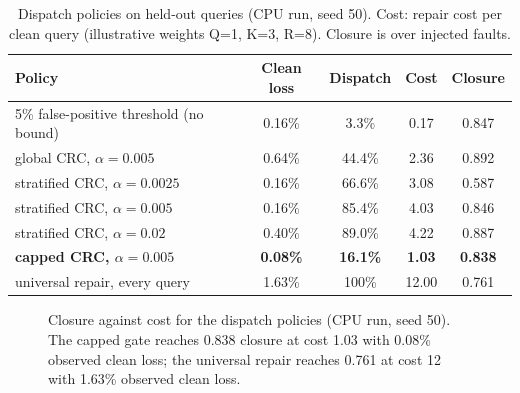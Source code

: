 \documentclass[conference]{IEEEtran}
\begin{document}
\begin{table}[t]
\caption{Dispatch policies on held-out queries (CPU run, seed 50). Cost: repair cost per clean query (illustrative weights Q=1, K=3, R=8). Closure is over injected faults.}
\label{tab:policy}
\centering\footnotesize
\begin{tabular}{@{}lcccc@{}}
\toprule
Policy & Clean loss & Dispatch & Cost & Closure\\
\midrule
5\% false-positive threshold (no bound) & 0.16\% & 3.3\% & 0.17 & 0.847\\
global CRC, $\alpha{=}0.005$ & 0.64\% & 44.4\% & 2.36 & 0.892\\
stratified CRC, $\alpha{=}0.0025$ & 0.16\% & 66.6\% & 3.08 & 0.587\\
stratified CRC, $\alpha{=}0.005$ & 0.16\% & 85.4\% & 4.03 & 0.846\\
stratified CRC, $\alpha{=}0.02$ & 0.40\% & 89.0\% & 4.22 & 0.887\\
\textbf{capped CRC, $\alpha{=}0.005$} & \textbf{0.08\%} & \textbf{16.1\%} & \textbf{1.03} & \textbf{0.838}\\
universal repair, every query & 1.63\% & 100\% & 12.00 & 0.761\\
\bottomrule
\end{tabular}
\end{table}

\begin{figure}[t]
\centering
{}
\caption{Closure against cost for the dispatch policies (CPU run, seed 50). The capped gate reaches 0.838 closure at cost 1.03 with 0.08\% observed clean loss; the universal repair reaches 0.761 at cost 12 with 1.63\% observed clean loss.}
\label{fig:pareto}
\end{figure}
\end{document}
